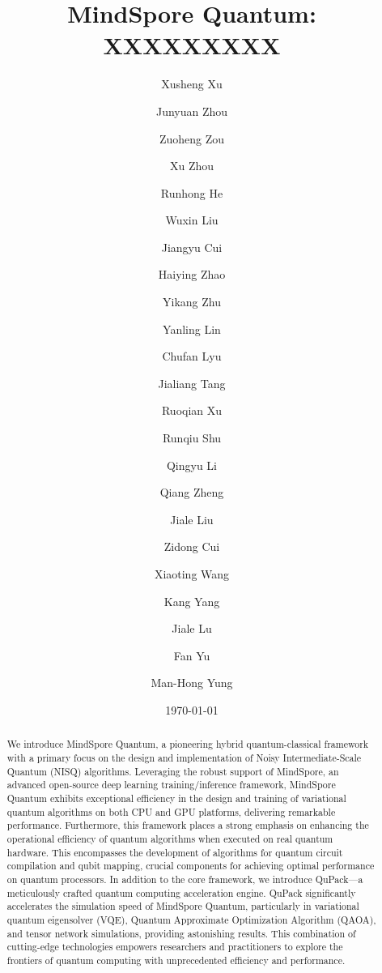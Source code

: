 \documentclass[pra,twocolumn,superscriptaddress,floatfix,nofootinbib,amsmath,amssymb]{revtex4-1}
\numberwithin{equation}{section}
\numberwithin{figure}{section}
\numberwithin{table}{section}
\begin{document}
\title{MindSpore Quantum: XXXXXXXXX
}

\author{Xusheng Xu}
\author{Junyuan Zhou}
\author{Zuoheng Zou}
\author{Xu Zhou}
\author{Runhong He}
\author{Wuxin Liu}
\author{Jiangyu Cui}
\author{Haiying Zhao}
\author{Yikang Zhu}
\author{Yanling Lin}
\author{Chufan Lyu}
\author{Jialiang Tang}
\author{Ruoqian Xu}
\author{Runqiu Shu}
\author{Qingyu Li}
\author{Qiang Zheng}
\author{Jiale Liu}
\author{Zidong Cui}
\author{Xiaoting Wang}
\author{Kang Yang}
\author{Jiale Lu}
\author{Fan Yu}
\author{Man-Hong Yung}

\date{\today}



\begin{abstract}
    We introduce MindSpore Quantum, a pioneering hybrid quantum-classical framework with a primary focus on the design and implementation of Noisy Intermediate-Scale Quantum (NISQ) algorithms. Leveraging the robust support of MindSpore, an advanced open-source deep learning training/inference framework, MindSpore Quantum exhibits exceptional efficiency in the design and training of variational quantum algorithms on both CPU and GPU platforms, delivering remarkable performance. Furthermore, this framework places a strong emphasis on enhancing the operational efficiency of quantum algorithms when executed on real quantum hardware. This encompasses the development of algorithms for quantum circuit compilation and qubit mapping, crucial components for achieving optimal performance on quantum processors. In addition to the core framework, we introduce QuPack—a meticulously crafted quantum computing acceleration engine. QuPack significantly accelerates the simulation speed of MindSpore Quantum, particularly in variational quantum eigensolver (VQE), Quantum Approximate Optimization Algorithm (QAOA), and tensor network simulations, providing astonishing results. This combination of cutting-edge technologies empowers researchers and practitioners to explore the frontiers of quantum computing with unprecedented efficiency and performance.
\end{abstract}
\maketitle
\tableofcontents
\end{document}
